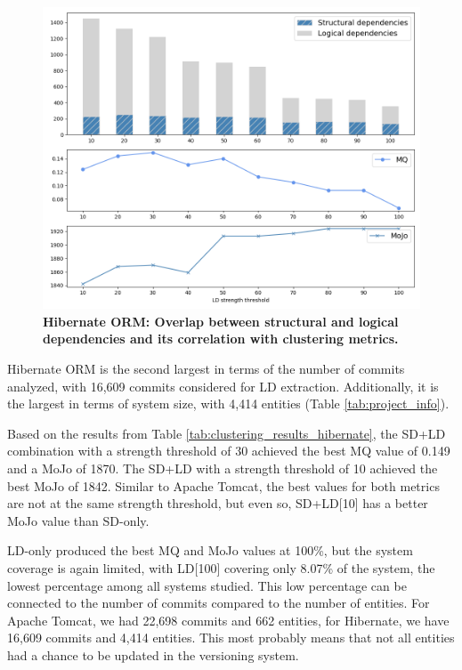 \documentclass{ieeeaccess}
\begin{document}
\begin{figure}[t!]
  \centering
  \includegraphics[width=\columnwidth]{hibernate_correlation.png}
  \caption{\textbf{Hibernate ORM: Overlap between structural and logical dependencies and its correlation with clustering metrics.}}
  \label{fig:hibernate_correlation}
\end{figure}

Hibernate ORM is the second largest in terms of the number of commits analyzed, with 16,609 commits considered for LD extraction. Additionally, it is the largest in terms of system size, with 4,414 entities (Table \ref{tab:project_info}).

Based on the results from Table \ref{tab:clustering_results_hibernate}, the SD+LD combination with a strength threshold of 30 achieved the best MQ value of 0.149 and a MoJo of 1870. The SD+LD with a strength threshold of 10 achieved the best MoJo of 1842. Similar to Apache Tomcat, the best values for both metrics are not at the same strength threshold, but even so, SD+LD[10] has a better MoJo value than SD-only.

LD-only produced the best MQ and MoJo values at 100\%, but the system coverage is again limited, with LD[100] covering only 8.07\% of the system, the lowest percentage among all systems studied. This low percentage can be connected to the number of commits compared to the number of entities. For Apache Tomcat, we had 22,698 commits and 662 entities, for Hibernate, we have 16,609 commits and 4,414 entities. This most probably means that not all entities had a chance to be updated in the versioning system.
\end{document}
